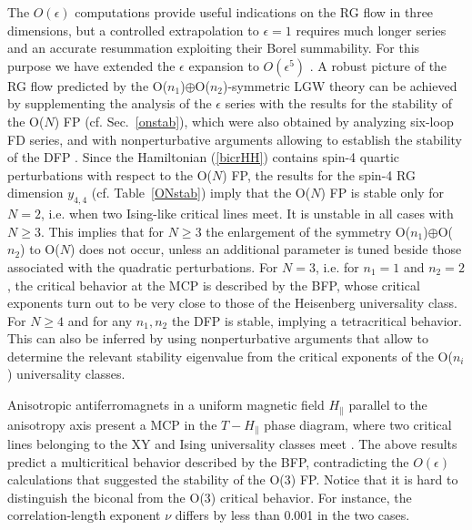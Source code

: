 \documentclass[a4paper,12pt]{article}
\begin{document}
The $O(\epsilon)$ computations provide useful indications on the 
RG flow in three  dimensions, but a controlled 
extrapolation to $\epsilon=1$ requires much longer series
and an accurate resummation exploiting their Borel summability.
For this purpose we have extended the $\epsilon$ expansion
to $O(\epsilon^5)$ \cite{CPV-02-mc}.  
A robust picture of the RG flow predicted by
the  O($n_1$)$\oplus$O($n_2$)-symmetric
LGW theory can be achieved 
by supplementing the analysis of the $\epsilon$ series 
with the results for the stability of
the O($N$) FP (cf. Sec.~\ref{onstab}),
which were also obtained by analyzing six-loop FD series,
and with nonperturbative arguments allowing to establish
the stability of the DFP \cite{Aharony-02}.
Since the Hamiltonian (\ref{bicrHH}) contains spin-4 quartic perturbations
with respect to the O($N$) FP,
the results for the spin-4 RG dimension $y_{4,4}$ 
(cf. Table~\ref{ONstab})
imply that the O($N$) FP is stable only for $N=2$, i.e.
when two Ising-like critical lines meet.
It is  unstable in all cases with $N\ge 3$.
This implies that for $N\ge 3$ the enlargement of the symmetry 
O($n_1$)$\oplus$O($n_2$) to O($N$) does not occur, unless
an additional parameter is tuned
beside those associated with the quadratic perturbations. 
For $N=3$, i.e. for $n_1=1$ and $n_2=2$,
 the critical behavior at the MCP is described by the BFP,
whose critical exponents turn out to be very close to those of
the Heisenberg universality class.
For $N\ge 4$ and for any $n_1,n_2$
the DFP is stable, implying a tetracritical behavior.
This can also be inferred by using nonperturbative arguments 
\cite{Aharony-02}
that allow to determine the relevant stability eigenvalue
from the critical exponents of the O($n_i$)
universality classes.

Anisotropic antiferromagnets in a uniform magnetic field $H_\parallel$
parallel to the anisotropy axis present a MCP 
in the $T-H_\parallel$ phase diagram, where two critical lines
belonging to the XY and Ising universality classes meet \cite{KNF-76}. 
The above results predict a multicritical behavior
described by the BFP, contradicting the $O(\epsilon)$ calculations
that suggested the stability of the O(3) FP.
Notice that it is hard to distinguish 
the biconal from the  O(3) critical behavior.
For instance, the correlation-length exponent
$\nu$ differs by less than 0.001 in the two cases.
\end{document}
